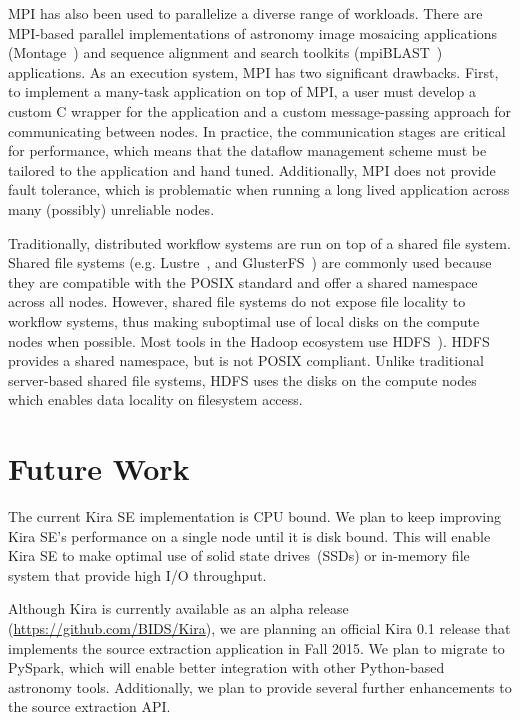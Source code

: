 \documentclass[conference]{IEEEtran}
\begin{document}
MPI has also been used to parallelize a diverse range of workloads. There
are MPI-based parallel implementations of astronomy image
mosaicing applications (Montage~\cite{jacob09}) and
sequence alignment and search toolkits (mpiBLAST~\cite{lin08}) applications. As an
execution system, MPI has two significant drawbacks. First, to implement a many-task
application on top of MPI, a user must develop a custom C wrapper for the application
and a custom message-passing approach for communicating between nodes. In practice, the
communication stages are critical for performance, which means that the
dataflow management scheme must be tailored to the application and hand tuned. Additionally,
MPI does not provide fault tolerance, which is problematic when running a long lived
application across many (possibly) unreliable nodes.

Traditionally, distributed workflow systems are run on top of a shared file system. 
Shared file systems (e.g. Lustre~\cite{donovan03}, and
GlusterFS~\cite{davies13}) are commonly used because they are compatible with the POSIX
standard and offer a shared namespace across all nodes. However, shared file systems
do not expose file locality to workflow systems, thus making suboptimal use of local
disks on the compute nodes when possible. Most tools in the Hadoop ecosystem use
HDFS~\cite{shvachko10}). HDFS  provides a shared namespace, but is not POSIX
compliant. Unlike traditional server-based shared file systems, HDFS uses
the disks on the compute nodes which enables data locality on filesystem access.

\section{Future Work}
\label{sec:Future}

The current Kira SE implementation is CPU bound. We plan to keep improving Kira SE's performance
on a single node until it is disk bound. This will enable Kira SE to make optimal use of
solid state drives~(SSDs) or in-memory file system that provide high I/O throughput.

Although Kira is currently available as an alpha release (\url{https://github.com/BIDS/Kira}), we are planning an official Kira 0.1 release
that implements the source extraction application in Fall 2015.
We plan to migrate to PySpark, which will enable better integration with other
Python-based astronomy tools. Additionally, we plan to provide several further enhancements to
the source extraction API.
\end{document}
